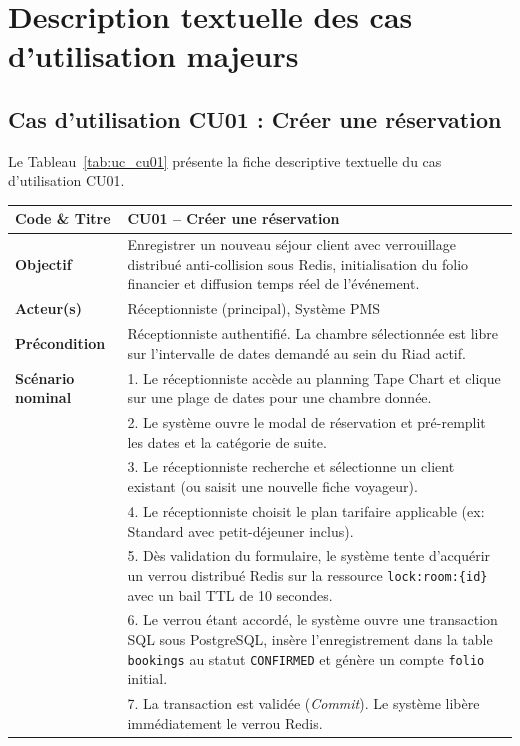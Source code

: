 \section{Description textuelle des cas d'utilisation majeurs}

\subsection{Cas d'utilisation CU01 : Créer une réservation}

Le Tableau~\ref{tab:uc_cu01} présente la fiche descriptive textuelle du cas d'utilisation CU01.

\begin{table}[H]
\centering
\small
\renewcommand{\arraystretch}{1.2}
\begin{tabularx}{\textwidth}{|p{3.5cm}|X|}
\hline
\textbf{Code \& Titre} & \textbf{CU01 -- Créer une réservation} \\
\hline
\textbf{Objectif} & Enregistrer un nouveau séjour client avec verrouillage distribué anti-collision sous Redis, initialisation du folio financier et diffusion temps réel de l'événement. \\
\hline
\textbf{Acteur(s)} & Réceptionniste (principal), Système PMS \\
\hline
\textbf{Précondition} & Réceptionniste authentifié. La chambre sélectionnée est libre sur l'intervalle de dates demandé au sein du Riad actif. \\
\hline
\textbf{Scénario nominal} & 
1. Le réceptionniste accède au planning Tape Chart et clique sur une plage de dates pour une chambre donnée.\\
& 2. Le système ouvre le modal de réservation et pré-remplit les dates et la catégorie de suite.\\
& 3. Le réceptionniste recherche et sélectionne un client existant (ou saisit une nouvelle fiche voyageur).\\
& 4. Le réceptionniste choisit le plan tarifaire applicable (ex: Standard avec petit-déjeuner inclus).\\
& 5. Dès validation du formulaire, le système tente d'acquérir un verrou distribué Redis sur la ressource \texttt{lock:room:\{id\}} avec un bail TTL de 10 secondes.\\
& 6. Le verrou étant accordé, le système ouvre une transaction SQL sous PostgreSQL, insère l'enregistrement dans la table \texttt{bookings} au statut \texttt{CONFIRMED} et génère un compte \texttt{folio} initial.\\
& 7. La transaction est validée (\textit{Commit}). Le système libère immédiatement le verrou Redis.\\

\end{tabularx}
\end{table}
